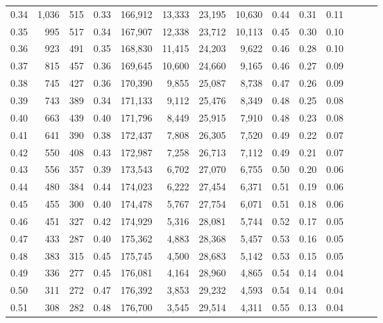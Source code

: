 \begin{tabular}{rrrrrrrrrrrrrr}
0.34 &   1,036 &    515 &  0.33 &  166,912 &   13,333 &  23,195 &  10,630 &  0.44 &  0.31 &      0.11 \\
0.35 &     995 &    517 &  0.34 &  167,907 &   12,338 &  23,712 &  10,113 &  0.45 &  0.30 &      0.10 \\
0.36 &     923 &    491 &  0.35 &  168,830 &   11,415 &  24,203 &   9,622 &  0.46 &  0.28 &      0.10 \\
0.37 &     815 &    457 &  0.36 &  169,645 &   10,600 &  24,660 &   9,165 &  0.46 &  0.27 &      0.09 \\
0.38 &     745 &    427 &  0.36 &  170,390 &    9,855 &  25,087 &   8,738 &  0.47 &  0.26 &      0.09 \\
0.39 &     743 &    389 &  0.34 &  171,133 &    9,112 &  25,476 &   8,349 &  0.48 &  0.25 &      0.08 \\
0.40 &     663 &    439 &  0.40 &  171,796 &    8,449 &  25,915 &   7,910 &  0.48 &  0.23 &      0.08 \\
0.41 &     641 &    390 &  0.38 &  172,437 &    7,808 &  26,305 &   7,520 &  0.49 &  0.22 &      0.07 \\
0.42 &     550 &    408 &  0.43 &  172,987 &    7,258 &  26,713 &   7,112 &  0.49 &  0.21 &      0.07 \\
0.43 &     556 &    357 &  0.39 &  173,543 &    6,702 &  27,070 &   6,755 &  0.50 &  0.20 &      0.06 \\
0.44 &     480 &    384 &  0.44 &  174,023 &    6,222 &  27,454 &   6,371 &  0.51 &  0.19 &      0.06 \\
0.45 &     455 &    300 &  0.40 &  174,478 &    5,767 &  27,754 &   6,071 &  0.51 &  0.18 &      0.06 \\
0.46 &     451 &    327 &  0.42 &  174,929 &    5,316 &  28,081 &   5,744 &  0.52 &  0.17 &      0.05 \\
0.47 &     433 &    287 &  0.40 &  175,362 &    4,883 &  28,368 &   5,457 &  0.53 &  0.16 &      0.05 \\
0.48 &     383 &    315 &  0.45 &  175,745 &    4,500 &  28,683 &   5,142 &  0.53 &  0.15 &      0.05 \\
0.49 &     336 &    277 &  0.45 &  176,081 &    4,164 &  28,960 &   4,865 &  0.54 &  0.14 &      0.04 \\
0.50 &     311 &    272 &  0.47 &  176,392 &    3,853 &  29,232 &   4,593 &  0.54 &  0.14 &      0.04 \\
0.51 &     308 &    282 &  0.48 &  176,700 &    3,545 &  29,514 &   4,311 &  0.55 &  0.13 &      0.04 \\

\end{tabular}
